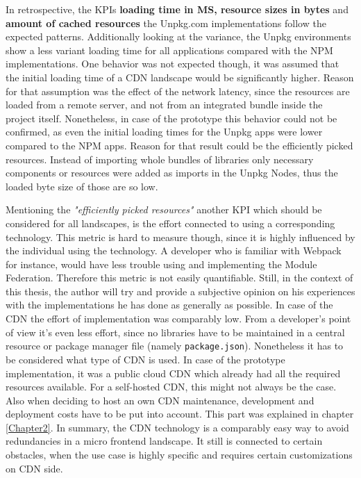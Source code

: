 In retrospective, the KPIs \textbf{loading time in MS, resource sizes in bytes} and \textbf{amount of cached resources} the Unpkg.com implementations follow the expected patterns. Additionally looking at the variance, the Unpkg environments show a less variant loading time for all applications compared with the NPM implementations. 
One behavior was not expected though, it was assumed that the initial loading time of a CDN landscape would be significantly higher. Reason for that assumption was the effect of the network latency, since the resources are loaded from a remote server, and not from an integrated bundle inside the project itself. Nonetheless, in case of the prototype this behavior could not be confirmed, as even the initial loading times for the Unpkg apps were lower compared to the NPM apps. Reason for that result could be the efficiently picked resources. Instead of importing whole bundles of libraries only necessary components or resources were added as imports in the Unpkg Nodes, thus the loaded byte size of those are so low.

Mentioning the \textit{"efficiently picked resources"} another KPI which should be considered for all landscapes, is the effort connected to using a corresponding technology. This metric is hard to measure though, since it is highly influenced by the individual using the technology. A developer who is familiar with Webpack for instance, would have less trouble using and implementing the Module Federation. Therefore this metric is not easily quantifiable. Still, in the context of this thesis, the author will try and provide a subjective opinion on his experiences with the implementations he has done as generally as possible. 
In case of the CDN the effort of implementation was comparably low. From a developer's point of view it's even less effort, since no libraries have to be maintained in a central resource or package manager file (namely \texttt{package.json}). Nonetheless it has to be considered what type of CDN is used.
In case of the prototype implementation, it was a public cloud CDN which already had all the required resources available. For a self-hosted CDN, this might not always be the case. Also when deciding to host an own CDN maintenance, development and deployment costs have to be put into account. This part was explained in chapter \ref{Chapter2}.
In summary, the CDN technology is a comparably easy way to avoid redundancies in a micro frontend landscape. It still is connected to certain obstacles, when the use case is highly specific and requires certain customizations on CDN side. 

